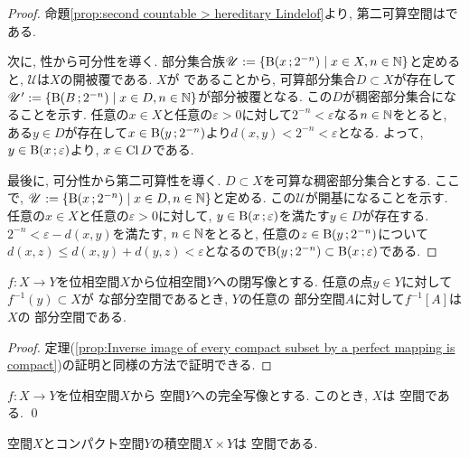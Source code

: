 \documentclass[uplatex, dvipdfmx, a4paper, 12pt, class=jsbook, crop=false]{standalone}
\begin{document}
\begin{proof}
命題\ref{prop:second countable > hereditary Lindelof}より, 第二可算空間は\Lindelof である.

次に, \Lindelof 性から可分性を導く. 部分集合族$ \mathscr{U} \defeq \setcomp{\topball{x}{2^{-n}}}{x \in X, n \in \N} $と定めると, $ \mathscr{U} $は$ X $の開被覆である. $ X $が \Lindelof であることから, 可算部分集合$ D \subset X $が存在して$ \mathscr{U}' \defeq \setcomp{\topball{B}{2^{-n}}}{x \in D, n \in \N} $が部分被覆となる. この$D$が稠密部分集合になることを示す. 任意の$ x \in X $と任意の$ \varepsilon > 0 $に対して$ 2^{-n} < \varepsilon $なる$ n \in \mathbb{N} $をとると, ある$ y \in D $が存在して$ x \in \topball{y}{2^{-n}}$より$ d(x, y) < 2^{-n} < \varepsilon $となる. よって, $ y \in \topball{x}{\varepsilon}$より, $ x \in \mathop{\mathrm{Cl}}\nolimits D $である.

最後に, 可分性から第二可算性を導く. $ D \subset X $を可算な稠密部分集合とする. ここで, $ \mathscr{U} \defeq \setcomp{\topball{x}{2^{-n}}}{x \in D, n \in \N} $と定める. この$\mathscr{U}$が開基になることを示す. 任意の$ x \in X $と任意の$ \varepsilon > 0 $に対して, $ y \in \topball{x}{\varepsilon}$を満たす$ y \in D $が存在する. $ 2^{-n} < \varepsilon - d(x, y) $を満たす, $ n \in \mathbb{N} $をとると, 任意の$ z \in \topball{y}{2^{-n}}$について$ d(x, z) \leq d(x, y) + d(y, z) < \varepsilon $となるので$\topball{y}{2^{-n}} \subset \topball{x}{\varepsilon}$である.
\end{proof}

\begin{theorem}
	$ f \colon X \to Y $を位相空間$ X $から位相空間$ Y $への閉写像とする. 任意の点$ y \in Y $に対して$ f^{-1}(y) \subset X $が \Lindelof な部分空間であるとき, $ Y $の任意の \Lindelof 部分空間$ A $に対して$ f^{-1}[A] $は$ X $の \Lindelof 部分空間である.
\end{theorem}

\begin{proof}
	定理(\ref{prop:Inverse image of every compact subset by a perfect mapping is compact})の証明と同様の方法で証明できる.
\end{proof}


\begin{corollary}
	$ f \colon X \to Y $を位相空間$ X $から \Lindelof 空間$ Y $への完全写像とする. このとき, $ X $は \Lindelof 空間である. \qed
\end{corollary}

\begin{corollary}
	\Lindelof 空間$ X $とコンパクト空間$ Y $の積空間$ X \times Y $は \Lindelof 空間である.
\end{corollary}
\end{document}
